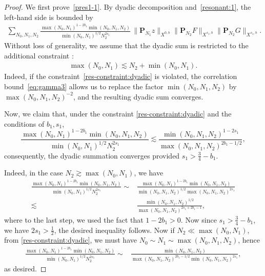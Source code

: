 \documentclass[11pt,reqno,english]{amsart}
\numberwithin{equation}{section}
\theoremstyle{plain}
\theoremstyle{definition}
\theoremstyle{remark}
\begin{document}
\begin{proof}
	We first prove~\eqref{pres1-1}. By dyadic decomposition and~\eqref{resonant:1}, the left-hand side is bounded by
	\begin{align*}
		\sum_{N_0,N_1,N_2}\frac{\max(N_0,N_1)^{1-2b_1}\min(N_0,N_1,N_2)}{\min(N_0,N_1)^{1/2}N_2^{2s_1}}\,\|\mathbf{P}_{N_1}z\|_{X^{0,b}}\|\mathbf{P}_{N_2}F\|_{X^{s_1,b}}\|\mathbf{P}_{N_2}G\|_{X^{s_1,b}}.
	\end{align*}
	Without loss of generality, we assume that the dyadic sum is restricted to the additional constraint :
	\begin{align}\label{res-constraint:dyadic}
		\max(N_0,N_1)\lesssim N_2+\min(N_0,N_1).
	\end{align}
	Indeed, if the constraint~\eqref{res-constraint:dyadic} is violated, the correlation bound~\eqref{eq:gamma3} allows us to replace the factor $\min(N_0,N_1,N_2)$ by $\max(N_0,N_1,N_2)^{-2}$, and the resulting dyadic sum converges.

	Now, we claim that, under the constraint \eqref{res-constraint:dyadic} and the conditions of $b_1,s_1$,
	\[
	\frac{\max(N_0,N_1)^{1-2b_1}\min(N_0,N_1,N_2)}{\min(N_0,N_1)^{1/2}N_2^{2s_1}} \lesssim \frac{\min(N_0,N_1,N_2)^{1-2s_1}}{\max(N_0,N_1,N_2)^{2b_1-1/2}},
	\]
	consequently, the dyadic summation converges provided $s_1>\frac{3}{4}-b_1$.
	\medskip
	
	Indeed, in the case $N_2\gtrsim \max(N_0,N_1)$, we have
	\begin{align*}
	\frac{\max(N_0,N_1)^{1-2b_1}\min(N_0,N_1,N_2) }{\min(N_0,N_1)^{1/2}N_2^{2s_1} }\sim &\frac{\max(N_0,N_1)^{1-2b_1}\min(N_0,N_1,N_2) }{\min(N_0,N_1,N_2)^{1/2}\max(N_0,N_1,N_2)^{2s_1} } \\
	\lesssim & \frac{\min(N_0,N_1,N_2)^{1/2} }{\max(N_0,N_1,N_2)^{2s_1+2b_1-1} },
	\end{align*}
where to the last step, we used the fact that $1-2b_1>0$. Now since $s_1>\frac{3}{4}-b_1$, we have $2s_1>\frac{1}{2}$, the desired inequality follows. Now if $N_2\ll \max(N_0,N_1)$, from \eqref{res-constraint:dyadic}, we must have $N_0\sim N_1\sim \max(N_0,N_1,N_2)$, hence
\begin{align*}
\frac{\max(N_0,N_1)^{1-2b_1}\min(N_0,N_1,N_2) }{\min(N_0,N_1)^{1/2}N_2^{2s_1} }\sim & \frac{\min(N_0,N_1,N_2)}{\max(N_0,N_1,N_2)^{2b_1-1/2}\min(N_0,N_1,N_2)^{2s_1} },
\end{align*}
as desired.
\medskip




\end{proof}
\end{document}

